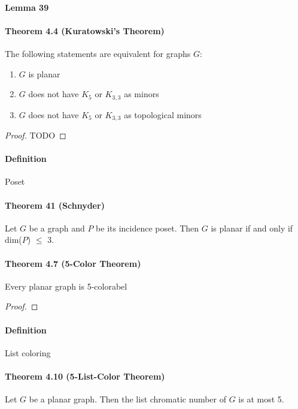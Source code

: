 \paragraph{Lemma 39}

\paragraph{Theorem 4.4 (Kuratowski's Theorem)} The following statements are 
equivalent for graphs $ G$:
\begin{enumerate}
    \item $ G $ is planar 
    \item $ G $ does not have $ K_5 $ or $ K_{3,3} $ as minors
    \item $ G $ does not have $ K_5 $ or $ K_{3,3} $ as topological minors
\end{enumerate}
\begin{proof}
    TODO
\end{proof}

\paragraph{Definition} Poset


\paragraph{Theorem 41 (Schnyder)} Let $ G $ be a graph and $ P $ be its incidence
poset. Then $ G $ is planar if and only if dim($P$) $\leq$ 3.

\paragraph{Theorem 4.7 (5-Color Theorem)} Every planar graph is 5-colorabel
\begin{proof}
    
\end{proof}

\paragraph{Definition} List coloring

\paragraph{Theorem 4.10 (5-List-Color Theorem)} Let $ G $ be a planar graph.
Then the list chromatic number of $ G $ is at most 5.